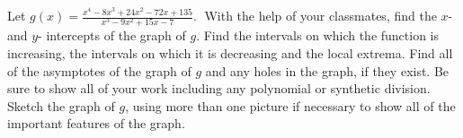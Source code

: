 {Let $g(x) = \displaystyle \frac{x^{4} - 8x^{3} + 24x^{2} - 72x + 135}{x^{3} - 9x^{2} + 15x - 7}.\;$  With the help of your classmates, find the $x$- and $y$- intercepts of the graph of $g$.  Find the intervals on which the function is increasing, the intervals on which it is decreasing and the local extrema. Find all of the asymptotes of the graph of $g$ and any holes in the graph, if they exist.  Be sure to show all of your work including any polynomial or synthetic division.  Sketch the graph of $g$, using more than one picture if necessary to show all of the important features of the graph.}
{}